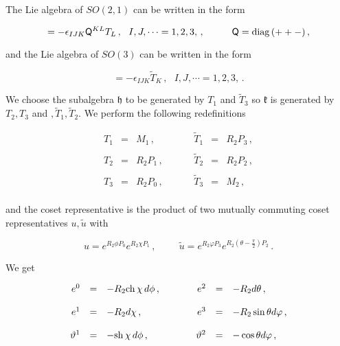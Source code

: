 \documentclass[12pt,a4paper]{article}
\begin{document}
The Lie algebra of $SO(2,1)$ can be written in the form

\begin{equation}
[T_{I},T_{J}]=-\epsilon_{IJK}\mathsf{Q}^{KL}T_{L}\, ,
\,\,\,\,
I,J,\cdots=1,2,3,\, ,  
\hspace{1cm}
\mathsf{Q}={\rm diag}\, (++-)\, , 
\end{equation}

\noindent
and the Lie algebra of $SO(3)$ can be written in the form

\begin{equation}
[\tilde{T}_{I},\tilde{T}_{J}]=-\epsilon_{IJK}\tilde{T}_{K}\, ,
\,\,\,\,
I,J,\cdots=1,2,3,\, .   
\end{equation}

We choose the subalgebra $\mathfrak{h}$ to be generated by $T_{1}$ and
$\tilde{T}_{3}$ so $\mathfrak{k}$ is generated by $T_{2},T_{3}$ and
$,\tilde{T}_{1},\tilde{T}_{2}$. We perform the following redefinitions

\begin{equation}
  \begin{array}{rclrcl}
T_{1} & = & M_{1}\, ,\hspace{1cm} &
\tilde{T}_{1} & = & R_{2}P_{3}\, ,\\
& & & & & \\
T_{2} & = & R_{2}P_{1}\, ,\hspace{1cm} &
\tilde{T}_{2} & = & R_{2}P_{2}\, ,\\
& & & & & \\
T_{3} & = & R_{2}P_{0}\, ,\hspace{1cm} &
\tilde{T}_{3} & = & M_{2}\, ,\\
  \end{array}
\end{equation}

\noindent 
and the coset representative is the product of two mutually commuting
coset representatives $u,\tilde{u}$ with

\begin{equation}
u = e^{R_{2}\phi P_{0}} e^{R_{2}\chi P_{1}}\, ,
\hspace{1cm}  
\tilde{u} = e^{R_{2}\varphi P_{3}} 
e^{R_{2}(\theta-\frac{\pi}{2}) P_{2}}\, .
\end{equation}

\noindent
We get

\begin{equation}
  \begin{array}{rclrcl}
e^{0} & = & -R_{2}{\rm ch}\, \chi\,  d\phi\, ,\hspace{1cm} &  
e^{2} & = & -R_{2}d\theta\, ,\\
& & & & & \\
e^{1} & = & -R_{2}d\chi\, ,&
e^{3} & = & -R_{2}\sin{\theta}d\varphi\, ,\\
& & & & & \\
\vartheta^{1} & = & -{\rm sh}\,\chi\, d\phi\, ,&
\vartheta^{2} & = & -\cos{\theta} d\varphi\, ,\\
  \end{array}
\end{equation}
\end{document}
